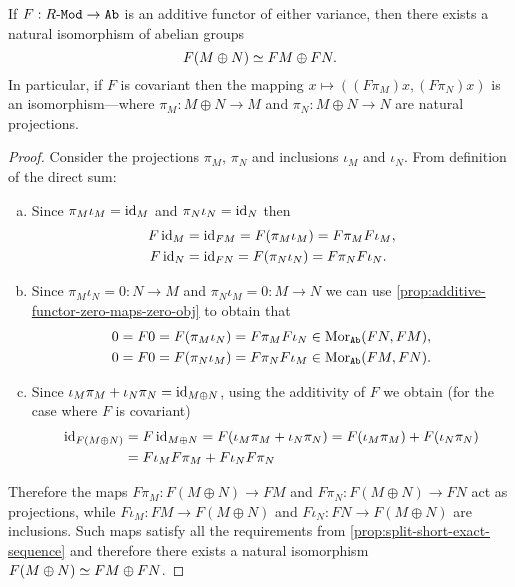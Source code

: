 \begin{proposition}
    \label{prop:additive-functor-mod-to-ab-preserves-direct-sum}
    If \(F: {R\text{-}\texttt{Mod}} \to {\texttt{Ab}}\) is an additive functor of either variance, then there
    exists a natural isomorphism of abelian groups
    \[
        F(M \oplus N) \simeq F M \oplus F N.
    \]
    In particular, if \(F\) is covariant then the mapping
    \(x \mapsto ((F \pi_M) x, (F \pi_N) x)\) is an isomorphism---where
    \(\pi_M: M \oplus N \to M\) and \(\pi_N: M \oplus N \to N\) are natural projections.
\end{proposition}

\begin{proof}
    Consider the projections \(\pi_M\), \(\pi_N\) and inclusions \(\iota_M\) and
    \(\iota_N\). From definition of the direct sum:
    \begin{enumerate}[(a)]\setlength\itemsep{0em}
        \item Since \(\pi_M \iota_M = \operatorname{id}_M\) and \(\pi_N \iota_N = \operatorname{id}_N\) then
              \begin{align*}
                  F \operatorname{id}_M & = \operatorname{id}_{F M} = F(\pi_M \iota_M) = F \pi_M F \iota_M, \\
                  F \operatorname{id}_N & = \operatorname{id}_{F N} = F(\pi_N \iota_N) = F \pi_N F \iota_N.
              \end{align*}

        \item Since \(\pi_M \iota_N = 0: N \to M\) and \(\pi_N \iota_M = 0: M \to N\) we can use
              \cref{prop:additive-functor-zero-maps-zero-obj} to obtain that
              \begin{align*}
                  0 & = F 0 = F(\pi_M \iota_N) = F \pi_M F \iota_N \in \operatorname{Mor}_{{\texttt{Ab}}}(F N, F M), \\
                  0 & = F 0 = F(\pi_N \iota_M) = F \pi_N F \iota_M \in \operatorname{Mor}_{{\texttt{Ab}}}(F M, F N).
              \end{align*}

        \item Since \(\iota_M \pi_M + \iota_N \pi_N = \operatorname{id}_{M \oplus N}\), using the additivity of \(F\)
              we obtain (for the case where \(F\) is covariant)
              \begin{align*}
                  \operatorname{id}_{F(M \oplus N)}
                   & = F \operatorname{id}_{M \oplus N}
                  = F(\iota_M \pi_M + \iota_N \pi_N)
                  = F(\iota_M \pi_M) + F(\iota_N \pi_N)      \\
                   & = F \iota_M F \pi_M + F \iota_N F \pi_N
              \end{align*}
    \end{enumerate}
    Therefore the maps \(F \pi_M: F(M \oplus N) \to F M\) and
    \(F \pi_N: F(M \oplus N) \to F N\) act as projections, while
    \(F \iota_M: F M \to F(M \oplus N)\) and \(F \iota_N: F N \to F(M \oplus N)\) are inclusions. Such
    maps satisfy all the requirements from \cref{prop:split-short-exact-sequence}
    and therefore there exists a natural isomorphism \(F(M \oplus N) \simeq F M \oplus F N\).
\end{proof}

